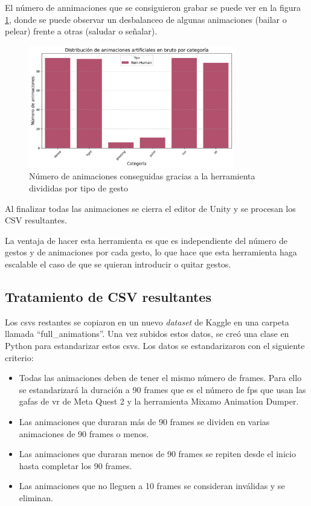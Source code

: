 El número de annimaciones que se consiguieron grabar se puede ver en la figura \ref{fig:AnimacionesBruto}, donde se puede observar un desbalanceo de algunas animaciones (bailar o pelear) frente a otras (saludar o señalar).

\begin{figure}[H]
    \centering
    \includegraphics[width=0.8\textwidth]{Imagenes/Bitmap/AnimacionesBruto.jpeg}
    \caption{Número de animaciones conseguidas gracias a la herramienta divididas por tipo de gesto}
    \label{fig:AnimacionesBruto}
\end{figure}

Al finalizar todas las animaciones se cierra el editor de Unity y se procesan los CSV resultantes.

La ventaja de hacer esta herramienta es que es independiente del número de gestos y de animaciones por cada gesto, lo que hace que esta herramienta haga escalable el caso de que se quieran introducir o quitar gestos.

\subsection{Tratamiento de CSV resultantes}

Los \glspl{csv} restantes se copiaron en un nuevo \textit{dataset} de Kaggle en una carpeta llamada ``full\_animations''. Una vez subidos estos datos, se creó una clase en Python para estandarizar estos \glspl{csv}. Los datos se estandarizaron con el siguiente criterio:
\begin{itemize}
    \item Todas las animaciones deben de tener el mismo número de frames. Para ello se estandarizará la duración a 90 frames que es el número de \gls{fps} que usan las gafas de \gls{vr} de Meta Quest 2 y la herramienta Mixamo Animation Dumper.
    \item Las animaciones que duraran más de 90 frames se dividen en varias animaciones de 90 frames o menos.
    \item Las animaciones que duraran menos de 90 frames se repiten desde el inicio hasta completar los 90 frames.
    \item Las animaciones que no lleguen a 10 frames se consideran inválidas y se eliminan.
\end{itemize}

